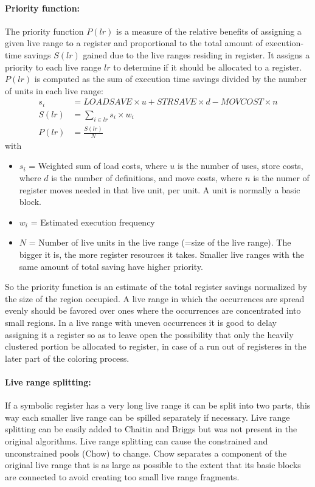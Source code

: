 \documentclass[a4paper,10pt]{article}
\begin{document}
\paragraph{Priority function:} The priority function $P(lr)$ is a measure of the relative benefits of assigning a given live range to a register and proportional to the total amount of execution-time savings $S(lr)$ gained due to the live ranges residing in register. It assigns a priority to each live range $lr$ to determine if it should be allocated to a register. $P(lr)$ is computed as the sum of execution time savings divided by the number of units in each live range:
\begin{align}
s_{i} &= LOADSAVE \times u + STRSAVE \times d - MOVCOST \times n\\
S(lr) &= \sum_{i\in lr}{s_i \times w_i}\\
P(lr) &= \frac{S(lr)}{N}
\end{align}
with
\begin{itemize}
	\item $s_i$ = Weighted sum of load costs, where $u$ is the number of uses, store costs, where $d$ is the number of definitions, and move costs, where $n$ is the numer of register moves needed in that live unit, per unit. A unit is normally a basic block.
	\item $w_i$ = Estimated execution frequency
	\item $N$ = Number of live units in the live range (=size of the live range). The bigger it is, the more register resources it takes. Smaller live ranges with the same amount of total saving have higher priority.
\end{itemize}

So the priority function is an estimate of the total register savings normalized by the size of the region occupied. A live range in which the occurrences are spread evenly should be favored over ones where the occurrences are concentrated into small regions. In a live range with uneven occurrences it is good to delay assigning it a register so as to leave open the possibility that only the heavily clustered portion be allocated to register, in case of a run out of registeres in the later part of the coloring process.

\paragraph{Live range splitting:} If a symbolic register has a very long live range it can be split into two parts, this way each smaller live range can be spilled separately if necessary. Live range splitting can be easily added to Chaitin and Briggs but was not present in the original algorithms. Live range splitting can cause the constrained and unconstrained pools (Chow) to change. Chow separates a component of the original live range that is as large as possible to the extent that its basic blocks are connected to avoid creating too small live range fragments.
\end{document}
